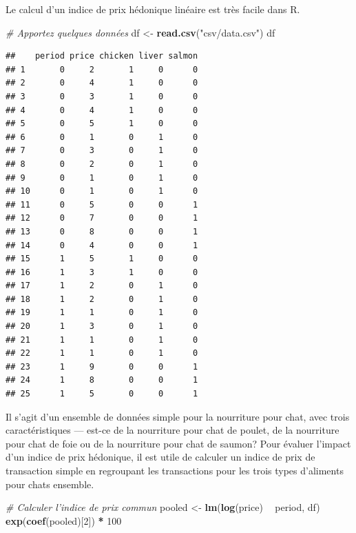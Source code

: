 \documentclass[]{article}
\newenvironment{Shaded}{\begin{snugshade}}{\end{snugshade}}
\newcommand{\CommentTok}[1]{\textcolor[rgb]{0.56,0.35,0.01}{\textit{#1}}}
\newcommand{\DecValTok}[1]{\textcolor[rgb]{0.00,0.00,0.81}{#1}}
\newcommand{\KeywordTok}[1]{\textcolor[rgb]{0.13,0.29,0.53}{\textbf{#1}}}
\newcommand{\NormalTok}[1]{#1}
\newcommand{\OperatorTok}[1]{\textcolor[rgb]{0.81,0.36,0.00}{\textbf{#1}}}
\newcommand{\StringTok}[1]{\textcolor[rgb]{0.31,0.60,0.02}{#1}}
\begin{document}
Le calcul d'un indice de prix hédonique linéaire est très facile dans R.

\begin{Shaded}
\begin{Highlighting}[]
\CommentTok{# Apportez quelques données}
\NormalTok{df <-}\StringTok{ }\KeywordTok{read.csv}\NormalTok{(}\StringTok{"csv/data.csv"}\NormalTok{)}
\NormalTok{df}
\end{Highlighting}
\end{Shaded}

\begin{verbatim}
##    period price chicken liver salmon
## 1       0     2       1     0      0
## 2       0     4       1     0      0
## 3       0     3       1     0      0
## 4       0     4       1     0      0
## 5       0     5       1     0      0
## 6       0     1       0     1      0
## 7       0     3       0     1      0
## 8       0     2       0     1      0
## 9       0     1       0     1      0
## 10      0     1       0     1      0
## 11      0     5       0     0      1
## 12      0     7       0     0      1
## 13      0     8       0     0      1
## 14      0     4       0     0      1
## 15      1     5       1     0      0
## 16      1     3       1     0      0
## 17      1     2       0     1      0
## 18      1     2       0     1      0
## 19      1     1       0     1      0
## 20      1     3       0     1      0
## 21      1     1       0     1      0
## 22      1     1       0     1      0
## 23      1     9       0     0      1
## 24      1     8       0     0      1
## 25      1     5       0     0      1
\end{verbatim}

Il s'agit d'un ensemble de données simple pour la nourriture pour chat, avec trois caractéristiques --- est-ce de la nourriture pour chat de poulet, de la nourriture pour chat de foie ou de la nourriture pour chat de saumon? Pour évaluer l'impact d'un indice de prix hédonique, il est utile de calculer un indice de prix de transaction simple en regroupant les transactions pour les trois types d'aliments pour chats ensemble.

\begin{Shaded}
\begin{Highlighting}[]
\CommentTok{# Calculer l'indice de prix commun}
\NormalTok{pooled <-}\StringTok{ }\KeywordTok{lm}\NormalTok{(}\KeywordTok{log}\NormalTok{(price) }\OperatorTok{~}\StringTok{ }\NormalTok{period, df)}
\KeywordTok{exp}\NormalTok{(}\KeywordTok{coef}\NormalTok{(pooled)[}\DecValTok{2}\NormalTok{]) }\OperatorTok{*}\StringTok{ }\DecValTok{100}
\end{Highlighting}
\end{Shaded}
\end{document}
